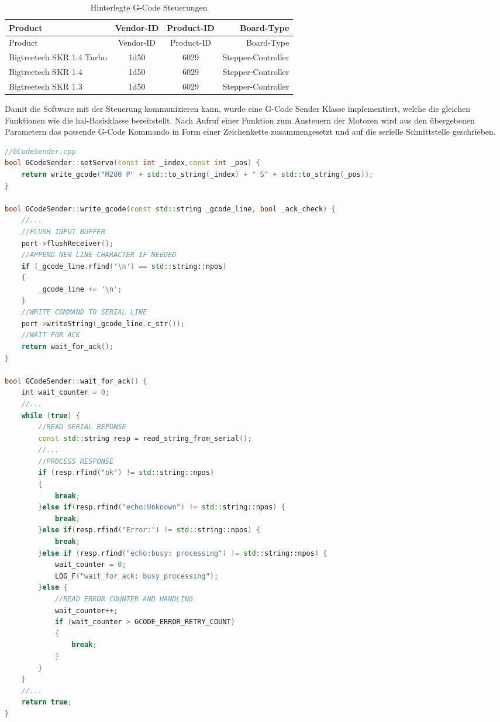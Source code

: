 \begin{longtable}[]{@{}lccr@{}}
\caption{Hinterlegte G-Code Steuerungen
\label{gcodeusbctl}}\tabularnewline
\toprule
Product & Vendor-ID & Product-ID & Board-Type\tabularnewline
\midrule
\endfirsthead
\toprule
Product & Vendor-ID & Product-ID & Board-Type\tabularnewline
\midrule
\endhead
Bigtreetech SKR 1.4 Turbo & 1d50 & 6029 &
Stepper-Controller\tabularnewline
Bigtreetech SKR 1.4 & 1d50 & 6029 & Stepper-Controller\tabularnewline
Bigtreetech SKR 1.3 & 1d50 & 6029 & Stepper-Controller\tabularnewline
\bottomrule
\end{longtable}

Damit die Software mit der Steuerung kommunizieren kann, wurde eine
G-Code Sender Klasse implementiert, welche die gleichen Funktionen wie
die \gls{hal}-Basisklasse bereitstellt. Nach Aufruf einer Funktion zum
Ansteuern der Motoren wird aus den übergebenen Parametern das passende
G-Code Kommando in Form einer Zeichenkette zusammengesetzt und auf die
serielle Schnittstelle geschrieben.

\begin{lstlisting}[language={C++}]
//GCodeSender.cpp
bool GCodeSender::setServo(const int _index,const int _pos) {
    return write_gcode("M280 P" + std::to_string(_index) + " S" + std::to_string(_pos));
}

bool GCodeSender::write_gcode(const std::string _gcode_line, bool _ack_check) {
    //...
    //FLUSH INPUT BUFFER
    port->flushReceiver();
    //APPEND NEW LINE CHARACTER IF NEEDED
    if (_gcode_line.rfind('\n') == std::string::npos)
    {
        _gcode_line += '\n';
    }
    //WRITE COMMAND TO SERIAL LINE
    port->writeString(_gcode_line.c_str());
    //WAIT FOR ACK
    return wait_for_ack();
}

bool GCodeSender::wait_for_ack() {
    int wait_counter = 0;
    //...
    while (true) {
        //READ SERIAL REPONSE
        const std::string resp = read_string_from_serial();
        //...
        //PROCESS RESPONSE
        if (resp.rfind("ok") != std::string::npos)
        {
            break;
        }else if(resp.rfind("echo:Unknown") != std::string::npos) {
            break;
        }else if(resp.rfind("Error:") != std::string::npos) {
            break;            
        }else if (resp.rfind("echo:busy: processing") != std::string::npos) {
            wait_counter = 0;
            LOG_F("wait_for_ack: busy_processing");
        }else {
            //READ ERROR COUNTER AND HANDLING
            wait_counter++;
            if (wait_counter > GCODE_ERROR_RETRY_COUNT)
            {
                break;
            }
        }
    }
    //...
    return true;
}
\end{lstlisting}


